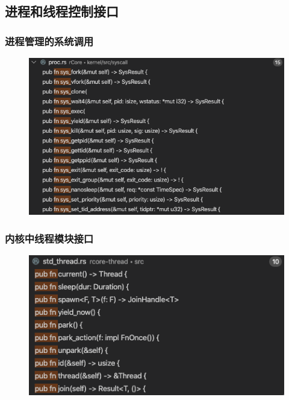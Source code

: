 \subsection{进程和线程控制接口} %
\begin{frame}[fragile]
    \frametitle{进程管理的系统调用}
    \begin{figure}
    \includegraphics[width=0.7\linewidth]{figs/proc-syscall.png}
    \end{figure}

\end{frame}
% 
% 
% 
% 
% 
\begin{frame}[fragile]
    \frametitle{内核中线程模块接口}
    \begin{figure}
    \includegraphics[width=0.7\linewidth]{figs/rcore-thread.png}
    \end{figure}

\end{frame}
% 
% 
% 
% 
% 

